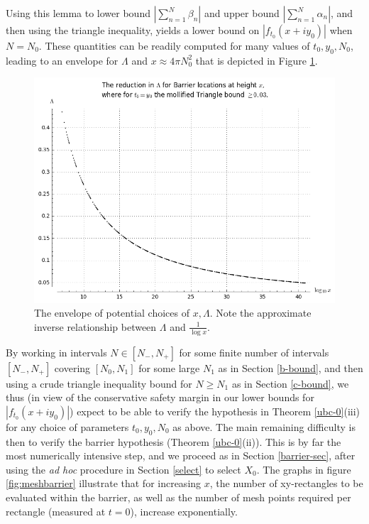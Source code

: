 \documentclass[a4paper,11pt,twoside]{amsart}
\begin{document}
Using this lemma to lower bound $|\sum_{n=1}^N \beta_n|$ and upper bound $|\sum_{n=1}^N \alpha_n|$, and then using the triangle inequality, yields a lower bound on $|f_{t_0}(x+iy_0)|$ when $N=N_0$.  These quantities can be readily computed for many values of $t_0,y_0,N_0$, leading to an envelope for $\Lambda$ and $x \approx 4 \pi N_0^2$ that is depicted in Figure \ref{tradeoff}.

\begin{figure}[!ht]
  \includegraphics[width=1.0\linewidth]{tradeoff.png}
  \caption{The envelope of potential choices of $x, \Lambda$.  Note the approximate inverse relationship between $\Lambda$ and $\frac{1}{\log x}$.}
  \label{tradeoff}
\end{figure}

By working in intervals $N \in [N_-,N_+]$ for some finite number of intervals $[N_-,N_+]$ covering $[N_0,N_1]$ for some large $N_1$ as in Section \ref{b-bound}, and then using a crude triangle inequality bound for $N \geq N_1$ as in Section \ref{c-bound}, we thus (in view of the conservative safety margin in our lower bounds for $|f_{t_0}(x+iy_0)|$) expect to be able to verify the hypothesis in Theorem \ref{ubc-0}(iii) for any choice of parameters $t_0, y_0, N_0$ as above.  The main remaining difficulty is then to verify the barrier hypothesis (Theorem \ref{ubc-0}(ii)).  This is by far the most numerically intensive step, and we proceed as in Section \ref{barrier-sec}, after using the \emph{ad hoc} procedure in Section \ref{select} to select $X_0$.   The graphs in figure \ref{fig:meshbarrier} illustrate that for increasing $x$, the number of xy-rectangles to be evaluated within the barrier, as well as the number of mesh points required per rectangle (measured at $t=0$), increase exponentially. 
\end{document}
